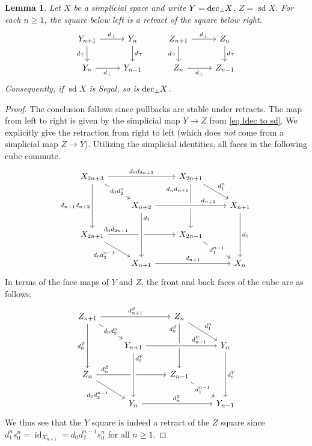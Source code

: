 \documentclass{amsart}
\newtheorem{lemma}[theorem]{Lemma}
\theoremstyle{definition}
\theoremstyle{remark}
\newcommand{\ldec}{\textup{dec}_{\perp}}
\DeclareMathOperator{\sd}{sd}
\DeclareMathOperator{\id}{id}
\begin{document}
\begin{lemma}\label{lem ldec square as retract}
Let $X$ be a simplicial space and write $Y = \ldec X$, $Z = \sd X$. For each $n \geq 1$, the square below left is a retract of the square below right.
\[ \begin{tikzcd}
Y_{n+1} \rar{d_\bot} \dar[swap]{d_\top} & Y_n \dar{d_\top} 
& Z_{n+1} \rar{d_\bot} \dar[swap]{d_\top} & Z_n \dar{d_\top} 
\\
Y_n \rar[swap]{d_\bot} & Y_{n-1}
&
Z_n \rar[swap]{d_\bot} & Z_{n-1}
\end{tikzcd} \]
Consequently, if $\sd X$ is Segal, so is $\ldec X$.
\end{lemma}
\begin{proof}
The conclusion follows since pullbacks are stable under retracts.
The map from left to right is given by the simplicial map $Y \to Z$ from \eqref{eq ldec to sd}.
We explicitly give the retraction from right to left (which does \emph{not} come from a simplicial map $Z \to Y$).
Utilizing the simplicial identities, all faces in the following cube commute.
\[ \begin{tikzcd}
X_{2n+3} \ar[rr,"d_0d_{2n+3}"] \ar[dd,"d_{n+1}d_{n+2}"'] \ar[dr,"d_0d_2^n" description] & & 
X_{2n+1} \ar[dd, "d_nd_{n+1}"' very near start] \ar[dr,"d_1^n"]  \\
& 
X_{n+2} \ar[rr,"d_{n+2}" near end, crossing over] & & 
X_{n+1} \ar[dd,"d_1"] \\
X_{2n+1} \ar[rr,"d_0d_{2n+1}" very near start] \ar[dr,"d_0d_2^{n-1}"'] & & X_{2n-1} \ar[dr,"d_1^{n-1}" description] \\
& X_{n+1} \ar[rr,"d_{n+1}"] \ar[from=uu, crossing over, "d_1" very near start] & & X_n
\end{tikzcd} \]
In terms of the face maps of $Y$ and $Z$, the front and back faces of the cube are as follows.
\[ \begin{tikzcd}
Z_{n+1} \ar[rr,"d_{n+1}^Z"] \ar[dd,"d_0^Z"'] \ar[dr,"d_0d_2^n" description] & & 
Z_n \ar[dd, "d_0^Z"' very near start] \ar[dr,"d_1^n"]  \\
& 
Y_{n+1} \ar[rr,"d_{n+1}^Y" near end, crossing over] & & 
Y_n \ar[dd,"d_0^Y"] \\
Z_n \ar[rr,"d_n^Z" very near start] \ar[dr,"d_0d_2^{n-1}"'] & & Z_{n-1} \ar[dr,"d_1^{n-1}" description] \\
& Y_n \ar[rr,"d_n^Y"] \ar[from=uu, crossing over, "d_0^Y" very near start] & & Y_{n-1}
\end{tikzcd} \]
We thus see that the $Y$ square is indeed a retract of the $Z$ square since $d_1^n s_0^n = \id_{X_{n+1}} = d_0 d_2^{n-1} s_0^n$ for all $n\geq 1$.
\end{proof}
\end{document}
